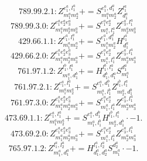 \documentclass[letterpaper,10pt,fleqn,leqno,onecolumn]{article}
\begin{document}
\begin{equation} \;\;\;\;\;\;  789.99.2.1: Z^{e_{1}^{a},l_{1}^{a}}_{m_{1}^{a}m_{2}^{a}}+=S^{e_{1}^{a},d_{1}^{a}}_{m_{1}^{a}m_{2}^{a}}Z^{l_{1}^{a}}_{d_{1}^{a}} \end{equation}
\begin{equation} \;\;\;\;\;\;  789.99.3.0: Z^{e_{1}^{a}e_{2}^{a}e_{3}^{a}}_{m_{1}^{a}m_{2}^{a}m_{3}^{a}}+=S^{e_{1}^{a}e_{2}^{a}}_{m_{1}^{a},l_{1}^{a}}Z^{e_{3}^{a},l_{1}^{a}}_{m_{2}^{a}m_{3}^{a}} \end{equation}
\begin{equation} \;\;\;\;\;\;  429.66.1.1: Z^{e_{1}^{a},l_{1}^{a}}_{m_{1}^{a}m_{2}^{a}}+=S^{e_{1}^{a},d_{1}^{a}}_{m_{1}^{a}m_{2}^{a}}H^{l_{1}^{a}}_{d_{1}^{a}} \end{equation}
\begin{equation} \;\;\;\;\;\;  429.66.2.0: Z^{e_{1}^{a}e_{2}^{a}e_{3}^{a}}_{m_{1}^{a}m_{2}^{a}m_{3}^{a}}+=S^{e_{1}^{a}e_{2}^{a}}_{m_{1}^{a},l_{1}^{a}}Z^{e_{3}^{a},l_{1}^{a}}_{m_{2}^{a}m_{3}^{a}} \end{equation}
\begin{equation} \;\;\;\;\;\;  761.97.1.2: Z^{l_{1}^{b},l_{1}^{a}}_{m_{1}^{a},d_{1}^{b}}+=H^{l_{1}^{b},l_{1}^{a}}_{d_{1}^{b},d_{1}^{a}}S^{d_{1}^{a}}_{m_{1}^{a}} \end{equation}
\begin{equation} \;\;\;\;\;\;  761.97.2.1: Z^{e_{1}^{a},l_{1}^{a}}_{m_{1}^{a}m_{2}^{a}}+=S^{e_{1}^{a},d_{1}^{b}}_{m_{1}^{a},l_{1}^{b}}Z^{l_{1}^{b},l_{1}^{a}}_{m_{2}^{a},d_{1}^{b}} \end{equation}
\begin{equation} \;\;\;\;\;\;  761.97.3.0: Z^{e_{1}^{a}e_{2}^{a}e_{3}^{a}}_{m_{1}^{a}m_{2}^{a}m_{3}^{a}}+=S^{e_{1}^{a}e_{2}^{a}}_{m_{1}^{a},l_{1}^{a}}Z^{e_{3}^{a},l_{1}^{a}}_{m_{2}^{a}m_{3}^{a}} \end{equation}
\begin{equation} \;\;\;\;\;\;  473.69.1.1: Z^{e_{1}^{a},l_{1}^{a}}_{m_{1}^{a}m_{2}^{a}}+=S^{e_{1}^{a},d_{1}^{b}}_{m_{1}^{a},l_{1}^{b}}H^{l_{1}^{b},l_{1}^{a}}_{m_{2}^{a},d_{1}^{b}}\cdot -1. \end{equation}
\begin{equation} \;\;\;\;\;\;  473.69.2.0: Z^{e_{1}^{a}e_{2}^{a}e_{3}^{a}}_{m_{1}^{a}m_{2}^{a}m_{3}^{a}}+=S^{e_{1}^{a}e_{2}^{a}}_{m_{1}^{a},l_{1}^{a}}Z^{e_{3}^{a},l_{1}^{a}}_{m_{2}^{a}m_{3}^{a}} \end{equation}
\begin{equation} \;\;\;\;\;\;  765.97.1.2: Z^{l_{1}^{a},l_{2}^{a}}_{m_{1}^{a},d_{1}^{a}}+=H^{l_{1}^{a},l_{2}^{a}}_{d_{1}^{a},d_{2}^{a}}S^{d_{2}^{a}}_{m_{1}^{a}}\cdot -1. \end{equation}
\end{document}
